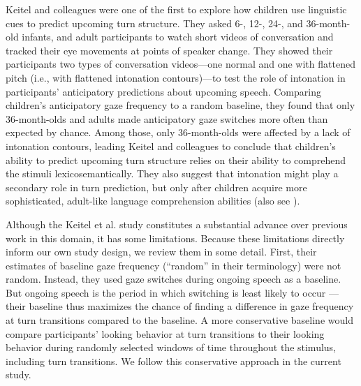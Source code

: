 \documentclass[authoryear, 12pt]{elsarticle}
\begin{document}

Keitel and colleagues \citeyearpar{keitel2013} were one of the first to explore how children use linguistic cues to predict upcoming turn structure. They asked 6-, 12-, 24-, and 36-month-old infants, and adult participants to watch short videos of conversation and tracked their eye movements at points of speaker change. They showed their participants two types of conversation videos---one normal and one with flattened pitch (i.e., with flattened intonation contours)---to test the role of intonation in participants' anticipatory predictions about upcoming speech. Comparing children's anticipatory gaze frequency to a random baseline, they found that only 36-month-olds and adults made anticipatory gaze switches more often than expected by chance. Among those, only 36-month-olds were affected by a lack of intonation contours, leading Keitel and colleagues to conclude that children's ability to predict upcoming turn structure relies on their ability to comprehend the stimuli lexicosemantically. They also suggest that intonation might play a secondary role in turn prediction, but only after children acquire more sophisticated, adult-like language comprehension abilities (also see \citealp{keitel2015}).

Although the Keitel et al. \citeyearpar{keitel2013} study constitutes a substantial advance over previous work in this domain, it has some limitations. Because these limitations directly inform our own study design, we review them in some detail. First, their estimates of baseline gaze frequency (``random'' in their terminology) were not random. Instead, they used gaze switches during ongoing speech as a baseline. But ongoing speech is the period in which switching is least likely to occur \citep{hirvenkari2013}---their baseline thus maximizes the chance of finding a difference in gaze frequency at turn transitions compared to the baseline. A more conservative baseline would compare participants' looking behavior at turn transitions to their looking behavior during randomly selected windows of time throughout the stimulus, including turn transitions. We follow this conservative approach in the current study. 
\end{document}

